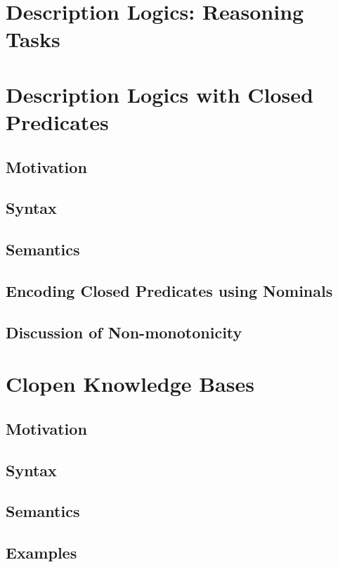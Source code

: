 \documentclass[12pt]{extarticle}
\begin{document}
\section{Description Logics: Reasoning Tasks}

\section{Description Logics with Closed Predicates}

\subsection{Motivation}

\subsection{Syntax}

\subsection{Semantics}

\subsection{Encoding Closed Predicates using Nominals}

\subsection{Discussion of Non-monotonicity}

\section{Clopen Knowledge Bases}

\subsection{Motivation}

\subsection{Syntax}

\subsection{Semantics}

\subsection{Examples}
\end{document}
